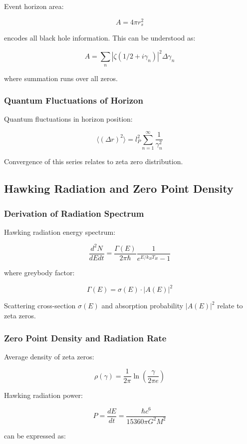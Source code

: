\documentclass[12pt,a4paper]{article}
\begin{document}
Event horizon area:

$$A = 4\pi r_s^2$$

encodes all black hole information. This can be understood as:

$$A = \sum_{n} |\zeta(1/2 + i\gamma_n)|^2 \Delta\gamma_n$$

where summation runs over all zeros.

\subsubsection{Quantum Fluctuations of Horizon}

Quantum fluctuations in horizon position:

$$\langle (\Delta r)^2 \rangle = l_P^2 \sum_{n=1}^{\infty} \frac{1}{\gamma_n^2}$$

Convergence of this series relates to zeta zero distribution.

\subsection{Hawking Radiation and Zero Point Density}

\subsubsection{Derivation of Radiation Spectrum}

Hawking radiation energy spectrum:

$$\frac{d^2N}{dEdt} = \frac{\Gamma(E)}{2\pi\hbar} \frac{1}{e^{E/k_BT_H} - 1}$$

where greybody factor:

$$\Gamma(E) = \sigma(E) \cdot |A(E)|^2$$

Scattering cross-section $\sigma(E)$ and absorption probability $|A(E)|^2$ relate to zeta zeros.

\subsubsection{Zero Point Density and Radiation Rate}

Average density of zeta zeros:

$$\rho(\gamma) = \frac{1}{2\pi} \ln\left(\frac{\gamma}{2\pi e}\right)$$

Hawking radiation power:

$$P = \frac{dE}{dt} = \frac{\hbar c^6}{15360\pi G^2 M^2}$$

can be expressed as:
\end{document}

